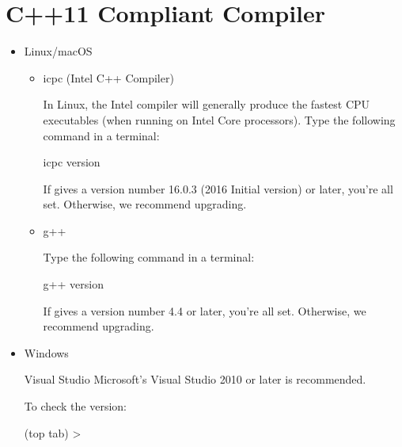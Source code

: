 \documentclass[letterpaper,10pt,english]{sphinxmanual}
\begin{document}
\section{C++11 Compliant Compiler}
\label{\detokenize{software_requirements:c-11-compliant-compiler}}\begin{itemize}
\item {} 
\sphinxAtStartPar
Linux/macOS
\begin{itemize}
\item {} 
\sphinxAtStartPar
icpc (Intel C++ Compiler)

\sphinxAtStartPar
In Linux, the Intel compiler will generally produce the fastest CPU executables (when running on Intel Core processors). Type the following command in a terminal:

\begin{sphinxVerbatim}[commandchars=\\\{\}]
\PYGZdl{} icpc \PYGZhy{}\PYGZhy{}version
\end{sphinxVerbatim}

\sphinxAtStartPar
If gives a version number 16.0.3 (2016 Initial version) or later, you’re all set. Otherwise, we recommend upgrading.

\item {} 
\sphinxAtStartPar
g++

\sphinxAtStartPar
Type the following command in a terminal:

\begin{sphinxVerbatim}[commandchars=\\\{\}]
\PYGZdl{} g++ \PYGZhy{}\PYGZhy{}version
\end{sphinxVerbatim}

\sphinxAtStartPar
If gives a version number 4.4 or later, you’re all set. Otherwise, we recommend upgrading.

\end{itemize}

\item {} 
\sphinxAtStartPar
Windows

\sphinxAtStartPar
Visual Studio Microsoft’s Visual Studio 2010 or later is recommended.

\sphinxAtStartPar
To check the version:

\sphinxAtStartPar
{} (top tab) \sphinxhyphen{}\textgreater{} 

\noindent{}

\noindent{}

\end{itemize}
\end{document}

